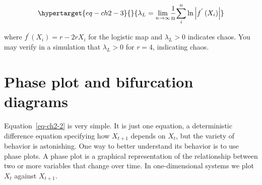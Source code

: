 \documentclass[
  a4paper,
  DIV=11,
  numbers=noendperiod]{scrreprt}
\begin{document}
\begin{equation}\protect\hypertarget{eq-ch2-3}{}{
{\lambda_{L} = \lim_{n \rightarrow \infty}}{\frac{1}{n}}{\sum_{i}^{n}{\ln\left| f^{'}\left( X_{i} \right) \right|}}}\label{eq-ch2-3}\end{equation}

where \(f^{'}\left( X_{i} \right) = r - 2rX_{i}\) for the logistic map
and \(\lambda_{L} > 0\) indicates chaos. You may verify in a simulation
that \(\lambda_{L} > 0\) for \(r = 4\), indicating chaos.

\hypertarget{sec-Phase-plot-and-bifurcation-diagrams}{%
\section{Phase plot and bifurcation
diagrams}\label{sec-Phase-plot-and-bifurcation-diagrams}}

Equation~\ref{eq-ch2-2} is very simple. It is just one equation, a
deterministic difference equation specifying how \(X_{t + 1}\) depends
on \(X_{t}\), but the variety of behavior is astonishing. One way to
better understand its behavior is to use phase plots. A phase plot is a
graphical representation of the relationship between two or more
variables that change over time. In one-dimensional systems we plot
\(X_{t}\) against \(X_{t + 1}\).
\end{document}
